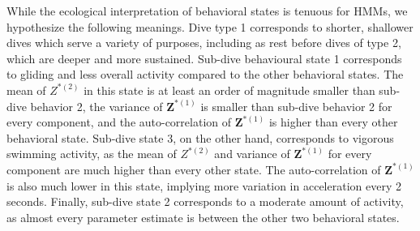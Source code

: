 %
While the ecological interpretation of behavioral states is tenuous for HMMs, we hypothesize the following meanings. Dive type 1 corresponds to shorter, shallower dives which serve a variety of purposes, including as rest before dives of type 2, which are deeper and more sustained. Sub-dive behavioural state 1 corresponds to gliding and less overall activity compared to the other behavioral states. The mean of $Z^{*(2)}$ in this state is at least an order of magnitude smaller than sub-dive behavior 2, the variance of $\mathbf{Z}^{*(1)}$ is smaller than sub-dive behavior 2 for every component, and the auto-correlation of $\mathbf{Z}^{*(1)}$ is higher than every other behavioral state. Sub-dive state 3, on the other hand, corresponds to vigorous swimming activity, as the mean of $Z^{*(2)}$ and variance of $\mathbf{Z}^{*(1)}$ for every component are much higher than every other state. The auto-correlation of $\mathbf{Z}^{*(1)}$ is also much lower in this state, implying more variation in acceleration every 2 seconds. Finally, sub-dive state 2 corresponds to a moderate amount of activity, as almost every parameter estimate is between the other two behavioral states.

